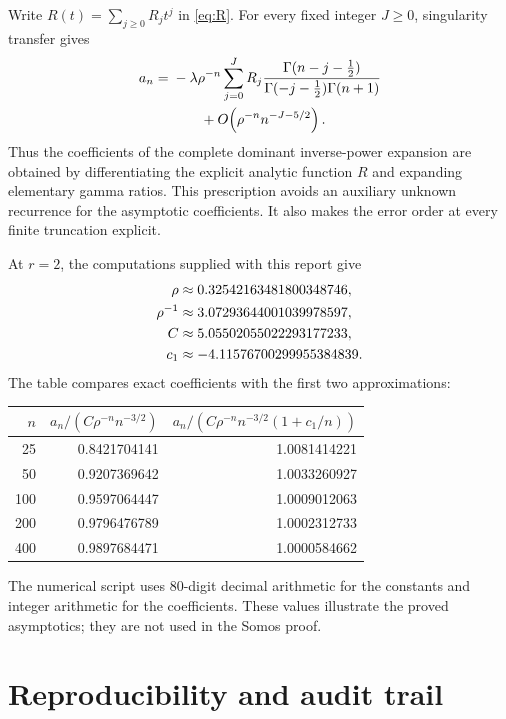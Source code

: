 \documentclass[11pt,letterpaper]{article}
\numberwithin{equation}{section}
\theoremstyle{definition}
\begin{document}
Write \(R(t)=\sum_{j\geq0}R_jt^j\) in \eqref{eq:R}. For every fixed
integer \(J\geq0\), singularity transfer gives
\begin{align}
 a_n={}&-\lambda\rho^{-n}
 \sum_{j=0}^{J}R_j
 \frac{\Gamma(n-j-\tfrac12)}{\Gamma(-j-\tfrac12)\Gamma(n+1)}
 \notag\\
 &\hspace{2em}{}+O\!\left(\rho^{-n}n^{-J-5/2}\right).
 \label{eq:allorders}
\end{align}
Thus the coefficients of the complete dominant inverse-power expansion are
obtained by differentiating the explicit analytic function \(R\) and
expanding elementary gamma ratios. This prescription avoids an auxiliary
unknown recurrence for the asymptotic coefficients. It also makes the
error order at every finite truncation explicit.

At \(r=2\), the computations supplied with this report give
\begin{align}
 \rho&\approx0.32542163481800348746,\notag\\
 \rho^{-1}&\approx3.07293644001039978597,\notag\\
 C&\approx5.05502055022293177233,\notag\\
 c_1&\approx-4.11576700299955384839.
 \label{eq:numericalconstants}
\end{align}
The table compares exact coefficients with the first two approximations:
\begin{center}
\begin{tabular}{r rr}
\toprule
\(n\)&\(a_n/(C\rho^{-n}n^{-3/2})\)
 &\(a_n/(C\rho^{-n}n^{-3/2}(1+c_1/n))\)\\
\midrule
25 &0.8421704141&1.0081414221\\
50 &0.9207369642&1.0033260927\\
100&0.9597064447&1.0009012063\\
200&0.9796476789&1.0002312733\\
400&0.9897684471&1.0000584662\\
\bottomrule
\end{tabular}
\end{center}
The numerical script uses 80-digit decimal arithmetic for the constants
and integer arithmetic for the coefficients. These values illustrate the
proved asymptotics; they are not used in the Somos proof.

\section{Reproducibility and audit trail}
\label{sec:reproduce}
\end{document}
